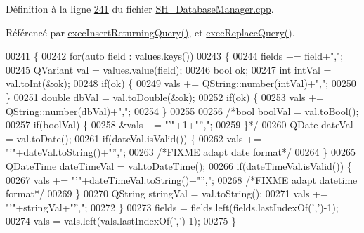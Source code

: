 Définition à la ligne \hyperlink{SH__DatabaseManager_8cpp_source_l00241}{241} du fichier \hyperlink{SH__DatabaseManager_8cpp_source}{S\-H\-\_\-\-Database\-Manager.\-cpp}.



Référencé par \hyperlink{classSH__DatabaseManager_a55268fae16792142072af49238f7bb94}{exec\-Insert\-Returning\-Query()}, et \hyperlink{classSH__DatabaseManager_a25e0f24d7833c2728f55b85be529063d}{exec\-Replace\-Query()}.


\begin{DoxyCode}
00241                                                                                              \{
00242     \textcolor{keywordflow}{for}(\textcolor{keyword}{auto} field : values.keys())
00243     \{
00244         fields += field+\textcolor{stringliteral}{","};
00245         QVariant val = values.value(field);
00246         \textcolor{keywordtype}{bool} ok;
00247         \textcolor{keywordtype}{int} intVal = val.toInt(&ok);
00248         \textcolor{keywordflow}{if}(ok) \{
00249             vals += QString::number(intVal)+\textcolor{stringliteral}{","};
00250         \}
00251         \textcolor{keywordtype}{double} dbVal = val.toDouble(&ok);
00252         \textcolor{keywordflow}{if}(ok) \{
00253             vals += QString::number(dbVal)+\textcolor{stringliteral}{","};
00254         \}
00255 
00256         \textcolor{comment}{/*bool boolVal = val.toBool();
}
00257 \textcolor{comment}{    if(boolVal) \{
}
00258 \textcolor{comment}{    &vals += "'"+1+"'',";
}
00259 \textcolor{comment}{    \}*/}
00260         QDate dateVal = val.toDate();
00261         \textcolor{keywordflow}{if}(dateVal.isValid()) \{
00262             vals += \textcolor{stringliteral}{"'"}+dateVal.toString()+\textcolor{stringliteral}{"'',"};
00263             \textcolor{comment}{/*FIXME adapt date format*/}
00264         \}
00265         QDateTime dateTimeVal = val.toDateTime();
00266         \textcolor{keywordflow}{if}(dateTimeVal.isValid()) \{
00267             vals += \textcolor{stringliteral}{"'"}+dateTimeVal.toString()+\textcolor{stringliteral}{"'',"};
00268             \textcolor{comment}{/*FIXME adapt datetime format*/}
00269         \}
00270         QString stringVal = val.toString();
00271         vals += \textcolor{stringliteral}{"'"}+stringVal+\textcolor{stringliteral}{"'',"};
00272     \}
00273     fields = fields.left(fields.lastIndexOf(\textcolor{charliteral}{','})-1);
00274     vals = vals.left(vals.lastIndexOf(\textcolor{charliteral}{','})-1);
00275 \}
\end{DoxyCode}
